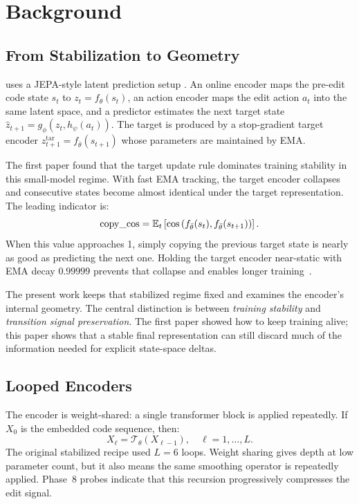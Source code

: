 \section{Background}
\label{sec:background}

\subsection{From Stabilization to Geometry}

\CodeWM{} uses a JEPA-style latent prediction setup
\citep{assran2023ijepa}.  An online encoder maps the pre-edit code state
$s_t$ to $z_t = f_\theta(s_t)$, an action encoder maps the edit action
$a_t$ into the same latent space, and a predictor estimates the next
target state $\hat{z}_{t+1} = g_\phi(z_t, h_\psi(a_t))$.  The target is
produced by a stop-gradient target encoder
$z_{t+1}^{\mathrm{tar}} = f_{\bar{\theta}}(s_{t+1})$ whose parameters are
maintained by EMA.

The first \CodeWM{} paper found that the target update rule dominates
training stability in this small-model regime.  With fast EMA tracking,
the target encoder collapses and consecutive states become almost
identical under the target representation.  The leading indicator is:
\begin{equation}
    \mathrm{copy\_cos} =
    \mathbb{E}_t\left[
    \cos\left(f_{\bar{\theta}}(s_t),
              f_{\bar{\theta}}(s_{t+1})\right)\right].
    \label{eq:copycos}
\end{equation}
When this value approaches 1, simply copying the previous target state is
nearly as good as predicting the next one.  Holding the target encoder
near-static with EMA decay $0.99999$ prevents that collapse and enables
longer training~\citep{akbulut2026collapse}.

The present work keeps that stabilized regime fixed and examines the
encoder's internal geometry.  The central distinction is between
\emph{training stability} and \emph{transition signal preservation}.
The first paper showed how to keep training alive; this paper shows that
a stable final representation can still discard much of the information
needed for explicit state-space deltas.

\subsection{Looped Encoders}

The encoder is weight-shared: a single transformer block is applied
repeatedly.  If $X_0$ is the embedded code sequence, then:
\begin{equation}
    X_\ell = \mathcal{T}_{\theta}(X_{\ell-1}),
    \quad \ell = 1,\ldots,L.
    \label{eq:looped_encoder}
\end{equation}
The original stabilized recipe used $L=6$ loops.  Weight sharing gives
depth at low parameter count, but it also means the same smoothing
operator is repeatedly applied.  Phase~8 probes indicate that this
recursion progressively compresses the edit signal.

